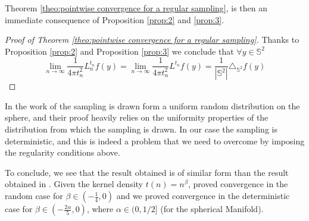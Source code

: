 \documentclass{article} %
\renewcommand{\S}{\mathbb{S}}
\newcommand{\nati}[1]{{\color[rgb]{.3,.5,.9}{#1}}}
\newcommand{\linefrac}[2]{
    {#1/#2}
}
\begin{document}
Theorem \ref{theo:pointwise convergence for a regular sampling}, is then an immediate consequence of Proposition \ref{prop:2} and \ref{prop:3}.
\begin{proof}[Proof of Theorem \ref{theo:pointwise convergence for a regular sampling}]
	Thanks to Proposition \ref{prop:2} and Proposition \ref{prop:3}	we conclude that $\forall y\in\S^2 $
	\begin{equation*}
	\lim_{n\to\infty}\frac{1}{4\pi t_n^2} L_n^{t_n}f(y) =  \lim_{n\to\infty}\frac{1}{4\pi t_n^2} L^{t_n}f(y) = \frac{1}{|\S^2|}\triangle_{\S^2}f(y)
	\end{equation*}
\end{proof}



In the work of \cite{belkin2005towards} the sampling is drawn form a uniform random distribution on the sphere, and their proof heavily relies on the uniformity properties of the distribution from which the sampling is drawn. In our case the sampling is deterministic, and this is indeed a problem that we need to overcome by imposing the regularity conditions above.

To conclude, we see that the result obtained is of similar form than the result obtained in \cite{belkin2005towards}. Given the kernel density $t(n)=n^\beta$, \cite{belkin2005towards} proved convergence in the random case for $\beta \in (-\frac{1}{4}, 0)$ and we proved convergence in the deterministic case for $\beta \in (-\frac{2\alpha}{5}, 0)$, where $\alpha \in (0, \linefrac{1}{2}]$ (for the spherical Manifold).
\end{document}
